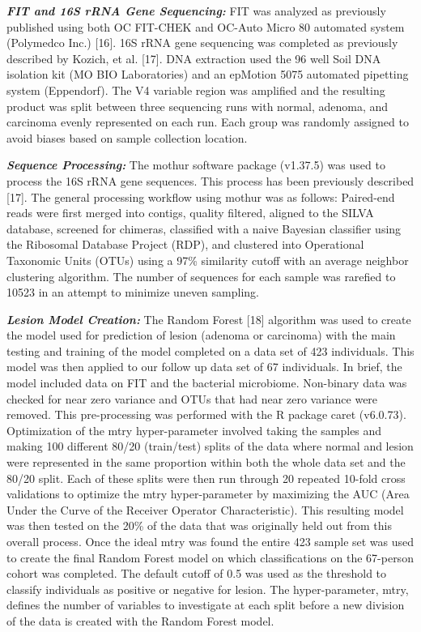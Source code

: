 \documentclass[12pt,]{article}
\begin{document}
\textbf{\emph{FIT and 16S rRNA Gene Sequencing:}} FIT was analyzed as
previously published using both OC FIT-CHEK and OC-Auto Micro 80
automated system (Polymedco Inc.) {[}16{]}. 16S rRNA gene sequencing was
completed as previously described by Kozich, et al. {[}17{]}. DNA
extraction used the 96 well Soil DNA isolation kit (MO BIO Laboratories)
and an epMotion 5075 automated pipetting system (Eppendorf). The V4
variable region was amplified and the resulting product was split
between three sequencing runs with normal, adenoma, and carcinoma evenly
represented on each run. Each group was randomly assigned to avoid
biases based on sample collection location.

\textbf{\emph{Sequence Processing:}} The mothur software package
(v1.37.5) was used to process the 16S rRNA gene sequences. This process
has been previously described {[}17{]}. The general processing workflow
using mothur was as follows: Paired-end reads were first merged into
contigs, quality filtered, aligned to the SILVA database, screened for
chimeras, classified with a naive Bayesian classifier using the
Ribosomal Database Project (RDP), and clustered into Operational
Taxonomic Units (OTUs) using a 97\% similarity cutoff with an average
neighbor clustering algorithm. The number of sequences for each sample
was rarefied to 10523 in an attempt to minimize uneven sampling.

\textbf{\emph{Lesion Model Creation:}} The Random Forest {[}18{]}
algorithm was used to create the model used for prediction of lesion
(adenoma or carcinoma) with the main testing and training of the model
completed on a data set of 423 individuals. This model was then applied
to our follow up data set of 67 individuals. In brief, the model
included data on FIT and the bacterial microbiome. Non-binary data was
checked for near zero variance and OTUs that had near zero variance were
removed. This pre-processing was performed with the R package caret
(v6.0.73). Optimization of the mtry hyper-parameter involved taking the
samples and making 100 different 80/20 (train/test) splits of the data
where normal and lesion were represented in the same proportion within
both the whole data set and the 80/20 split. Each of these splits were
then run through 20 repeated 10-fold cross validations to optimize the
mtry hyper-parameter by maximizing the AUC (Area Under the Curve of the
Receiver Operator Characteristic). This resulting model was then tested
on the 20\% of the data that was originally held out from this overall
process. Once the ideal mtry was found the entire 423 sample set was
used to create the final Random Forest model on which classifications on
the 67-person cohort was completed. The default cutoff of 0.5 was used
as the threshold to classify individuals as positive or negative for
lesion. The hyper-parameter, mtry, defines the number of variables to
investigate at each split before a new division of the data is created
with the Random Forest model.
\end{document}
